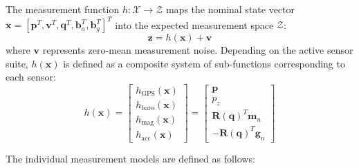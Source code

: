 \documentclass{article}
\begin{document}
	The measurement function $h: \mathcal{X} \to \mathcal{Z}$ maps the nominal state vector $\mathbf{x} = [\mathbf{p}^T, \mathbf{v}^T, \mathbf{q}^T, \mathbf{b}_a^T, \mathbf{b}_g^T]^T$ into the expected measurement space $\mathcal{Z}$:
	\begin{equation}
		\mathbf{z} = h(\mathbf{x}) + \mathbf{v}
	\end{equation}
	where $\mathbf{v}$ represents zero-mean measurement noise. Depending on the active sensor suite, $h(\mathbf{x})$ is defined as a composite system of sub-functions corresponding to each sensor:
	\begin{equation}
		h(\mathbf{x}) = 
		\begin{bmatrix}
			h_{\text{GPS}}(\mathbf{x}) \\
			h_{\text{baro}}(\mathbf{x}) \\
			h_{\text{mag}}(\mathbf{x}) \\
			h_{\text{acc}}(\mathbf{x})
		\end{bmatrix} =
		\begin{bmatrix}
			\mathbf{p} \\
			p_z \\
			\mathbf{R}(\mathbf{q})^T \mathbf{m}_n \\
			-\mathbf{R}(\mathbf{q})^T \mathbf{g}_n
		\end{bmatrix}
	\end{equation}
	
	The individual measurement models are defined as follows:
	
\end{document}
